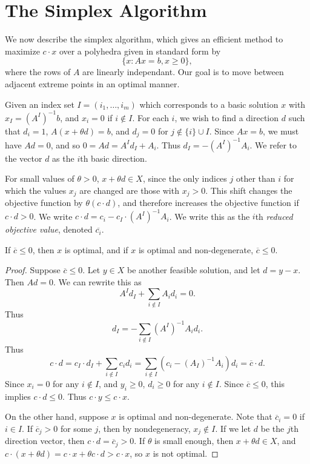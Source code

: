 \chapter{The Simplex Algorithm}

We now describe the simplex algorithm, which gives an efficient method to maximize $c \cdot x$ over a polyhedra given in standard form by
%
\[ \{ x : Ax = b, x \geq 0 \}, \]
%
where the rows of $A$ are linearly independant. Our goal is to move between adjacent extreme points in an optimal manner.

Given an index set $I = (i_1, \dots, i_m)$ which corresponds to a basic solution $x$ with $x_I = (A^I)^{-1}b$, and $x_i = 0$ if $i \not \in I$. For each $i$, we wish to find a direction $d$ such that $d_i = 1$, $A(x + \theta d) = b$, and $d_j = 0$ for $j \not \in \{ i \} \cup I$. Since $Ax = b$, we must have $Ad = 0$, and so $0 = Ad = A^Id_I + A_i$. Thus $d_I = -(A^I)^{-1}A_i$. We refer to the vector $d$ as the $i$th basic direction.

For small values of $\theta > 0$, $x + \theta d \in X$, since the only indices $j$ other than $i$ for which the values $x_j$ are changed are those with $x_j > 0$. This shift changes the objective function by $\theta (c \cdot d)$, and therefore increases the objective function if $c \cdot d > 0$. We write $c \cdot d = c_i - c_I \cdot (A^I)^{-1} A_i$. We write this as the $i$th \emph{reduced objective value}, denoted $\overline{c_i}$.

\begin{lemma}
    If $\overline{c} \leq 0$, then $x$ is optimal, and if $x$ is optimal and non-degenerate, $\overline{c} \leq 0$.
\end{lemma}
\begin{proof}
    Suppose $\overline{c} \leq 0$. Let $y \in X$ be another feasible solution, and let $d = y - x$. Then $Ad = 0$. We can rewrite this as
    \[ A^I d_I + \sum_{i \not \in I} A_id_i = 0. \]
    Thus
    \[ d_I = - \sum_{i \not \in I} (A^I)^{-1} A_i d_i. \]
    Thus
    \[ c \cdot d = c_I \cdot d_I + \sum_{i \not \in I} c_i d_i = \sum_{i \not \in I} (c_i - (A_I)^{-1} A_i) d_i = \overline{c} \cdot d. \]
    Since $x_i = 0$ for any $i \not \in I$, and $y_i \geq 0$, $d_i \geq 0$ for any $i \not \in I$. Since $\overline{c} \leq 0$, this implies $c \cdot d \leq 0$. Thus $c \cdot y \leq c \cdot x$.

    On the other hand, suppose $x$ is optimal and non-degenerate. Note that $\overline{c}_i = 0$ if $i \in I$. If $\overline{c}_j > 0$ for some $j$, then by nondegeneracy, $x_j \not \in I$. If we let $d$ be the $j$th direction vector, then $c \cdot d = \overline{c}_j > 0$. If $\theta$ is small enough, then $x + \theta d \in X$, and $c \cdot (x + \theta d) = c \cdot x + \theta c \cdot d > c \cdot x$, so $x$ is not optimal.
\end{proof}

